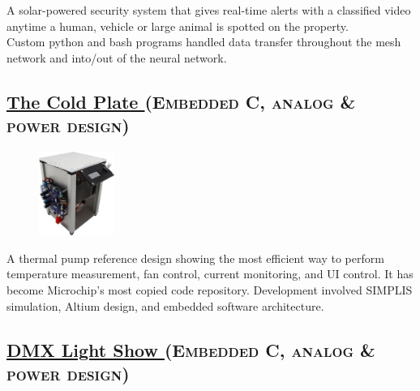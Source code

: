 \documentclass[
	10pt, %
]{FreemanCV}
\begin{document}
\begin{paracol}{2}
A solar-powered security system that gives real-time alerts with a classified video anytime a human, vehicle or large animal is spotted
on the property.\\

Custom python and bash programs handled data transfer throughout the mesh network and into/out of the neural network.

\switchcolumn

\vspace*{-10pt}
\leavevmode \subsection{\href{https://github.com/microchip-pic-avr-examples/pic16f17146-cold-plate-mplab-mcc}{The Cold Plate \linkcolor\scriptsize\faLink}
\hfill
\textsc{\footnotesize{(Embedded C, analog \& power design)}}}

\setlength\intextsep{0pt} %
\begin{figure} %
	\hspace*{-5pt} %
    \includegraphics[width=70pt]{cold_plate} %
\end{figure}

A thermal pump reference design showing the most efficient way to perform temperature measurement, fan control, current monitoring, and UI control.
 It has become Microchip's most copied code repository. Development involved SIMPLIS simulation, Altium design, and embedded software architecture.



\vspace*{20pt} %
\leavevmode\subsection{\href{https://github.com/microchip-pic-avr-examples/pic16f56q71-audio-light-show-mplab-mcc}{DMX Light Show \linkcolor\scriptsize\faLink}
\hfill
\textsc{\footnotesize{(Embedded C, analog \& power design)}}}


\end{paracol}
\end{document}
